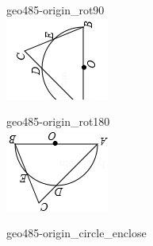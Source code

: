 \documentclass[12pt]{article}
\begin{document}
\begin{center}
\begin{minipage}{0.32\textwidth}
geo485-origin\_rot90\\
\includegraphics[width=0.95\linewidth]{out_rommath_origin/items/geo485-origin/assets/figure_rot90.png}
\end{minipage}
\par\medskip
\begin{minipage}{0.32\textwidth}\centering
geo485-origin\_rot180\\
\includegraphics[width=0.95\linewidth]{out_rommath_origin/items/geo485-origin/assets/figure_rot180.png}
\end{minipage}
\hfill\begin{minipage}{0.32\textwidth}\centering
geo485-origin\_circle\_enclose\\

\end{minipage}
\end{center}
\end{document}
